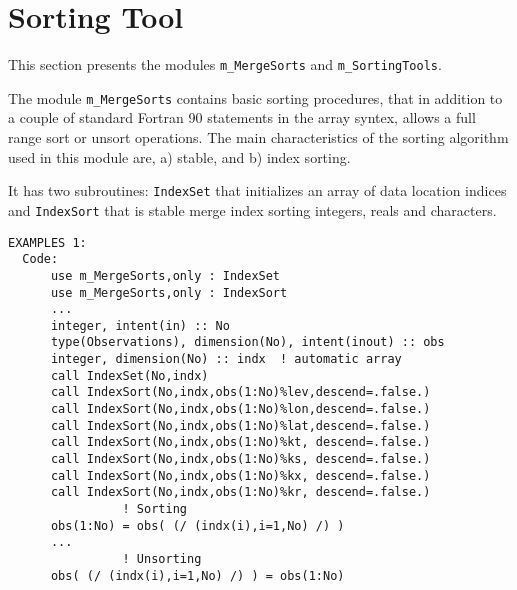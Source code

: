 %  
%  
%  
\section{Sorting Tool}
%
This section presents the modules {\tt m\_MergeSorts} and
{\tt m\_SortingTools}.

\noindent
The module {\tt m\_MergeSorts} contains basic sorting procedures, that in
addition to a couple of standard Fortran 90 statements in the
array syntex, allows a full range sort or unsort operations.
The main characteristics of the sorting algorithm used in this
module are, a) stable, and b) index sorting.

It has two subroutines: {\tt IndexSet} that initializes an array of data
location indices and {\tt IndexSort} that is stable merge index sorting
integers, reals and characters.
%
\begin{verbatim}
EXAMPLES 1:
  Code:
      use m_MergeSorts,only : IndexSet
      use m_MergeSorts,only : IndexSort
      ...
      integer, intent(in) :: No
      type(Observations), dimension(No), intent(inout) :: obs
      integer, dimension(No) :: indx  ! automatic array
      call IndexSet(No,indx)
      call IndexSort(No,indx,obs(1:No)%lev,descend=.false.)
      call IndexSort(No,indx,obs(1:No)%lon,descend=.false.)
      call IndexSort(No,indx,obs(1:No)%lat,descend=.false.)
      call IndexSort(No,indx,obs(1:No)%kt, descend=.false.)
      call IndexSort(No,indx,obs(1:No)%ks, descend=.false.)
      call IndexSort(No,indx,obs(1:No)%kx, descend=.false.)
      call IndexSort(No,indx,obs(1:No)%kr, descend=.false.)
                ! Sorting
      obs(1:No) = obs( (/ (indx(i),i=1,No) /) )
      ...
                ! Unsorting
      obs( (/ (indx(i),i=1,No) /) ) = obs(1:No)
\end{verbatim}
 
